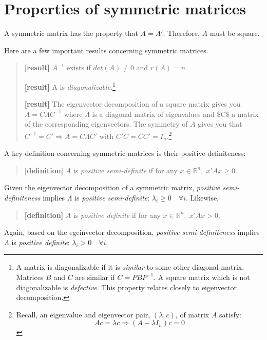 \documentclass[
  letterpaper,
  DIV=11,
  numbers=noendperiod]{scrreprt}
\begin{document}
\hypertarget{properties-of-symmetric-matrices}{%
\section{Properties of symmetric
matrices}\label{properties-of-symmetric-matrices}}

A symmetric matrix has the property that \(A=A'\). Therefore, \(A\) must
be square.

Here are a few important results concerning symmetric matrices.

\begin{quote}
\textbf{{[}result{]}} \(A^{-1}\) exists if \(det(A)\neq 0\) and
\(r(A)=n\)

\textbf{{[}result{]}} A is \emph{diagonalizable}.\footnote{A matrix is
  diagonalizable if it is \emph{similar} to some other diagonal matrix.
  Matrices \(B\) and \(C\) are similar if \(C=PBP^{-1}\). A square
  matrix which is not diagonalizable is \emph{defective}. This property
  relates closely to eigenvector decomposition.}

\textbf{{[}result{]}} The eigenvector decomposition of a square matrix
gives you \(A=C\Lambda C^{-1}\) where \(\Lambda\) is a diagonal matrix
of eigenvalues and \$C\$ a matrix of the corresponding eigenvectors. The
symmetry of \(A\) gives you that \(C^{-1}=C'\Rightarrow A=C\Lambda C'\)
with \(C'C=CC'=I_{n}\).\footnote{Recall, an eigenvalue and eigenvector
  pair, \((\lambda,c)\), of matrix \(A\) satisfy:\\
  \[
  Ac = \lambda c\Rightarrow (A-\lambda I_n)c=0
  \]}
\end{quote}

A key definition concerning symmetric matrices is their positive
definiteness:

\begin{quote}
\textbf{{[}definition{]}} \(A\) is \emph{positive semi-definite} if for
any \(x\in\mathbb{R}^n,\;x'Ax\geq0\).
\end{quote}

Given the eigenvector decomposition of a symmetric matrix,
\emph{positive semi-definiteness} implies \(\Lambda\) is \emph{positive
semi-definite}: \(\lambda_i\geq0\quad\forall i\). Likewise,

\begin{quote}
\textbf{{[}definition{]}} \(A\) is \emph{positive definite} if for any
\(x\in\mathbb{R}^n,\;x'Ax>0\).
\end{quote}

Again, based on the egeinvector decomposition, \emph{positive
semi-definiteness} implies \(\Lambda\) is \emph{positive definite}:
\(\lambda_i>0\quad\forall i\).
\end{document}
